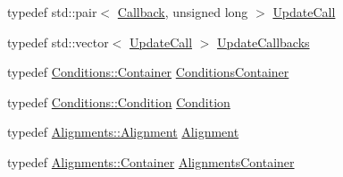 \begin{DoxyCompactItemize}
\item 
typedef std\+::pair$<$ \hyperlink{class_d_d4hep_1_1_callback}{Callback}, unsigned long $>$ \hyperlink{class_d_d4hep_1_1_geometry_1_1_det_element_object_a3b316c36c1b168152e4c96a42ca561aa}{Update\+Call}
\item 
typedef std\+::vector$<$ \hyperlink{class_d_d4hep_1_1_geometry_1_1_det_element_object_a3b316c36c1b168152e4c96a42ca561aa}{Update\+Call} $>$ \hyperlink{class_d_d4hep_1_1_geometry_1_1_det_element_object_aa3bda3e351cc13f5bcce906a67d21872}{Update\+Callbacks}
\item 
typedef \hyperlink{class_d_d4hep_1_1_conditions_1_1_container}{Conditions\+::\+Container} \hyperlink{class_d_d4hep_1_1_geometry_1_1_det_element_object_a01728952c7dd2f2c102e2a1ae25b80ff}{Conditions\+Container}
\item 
typedef \hyperlink{class_d_d4hep_1_1_conditions_1_1_condition}{Conditions\+::\+Condition} \hyperlink{class_d_d4hep_1_1_geometry_1_1_det_element_object_ad16c1a834041ed152dee870f1ec346da}{Condition}
\item 
typedef \hyperlink{class_d_d4hep_1_1_alignments_1_1_alignment}{Alignments\+::\+Alignment} \hyperlink{class_d_d4hep_1_1_geometry_1_1_det_element_object_aaf1bb49d0e1799f548f775b35e3cb590}{Alignment}
\item 
typedef \hyperlink{class_d_d4hep_1_1_alignments_1_1_container}{Alignments\+::\+Container} \hyperlink{class_d_d4hep_1_1_geometry_1_1_det_element_object_ab920e3c690de8d093cb556b0d3c87ce8}{Alignments\+Container}
\end{DoxyCompactItemize}
